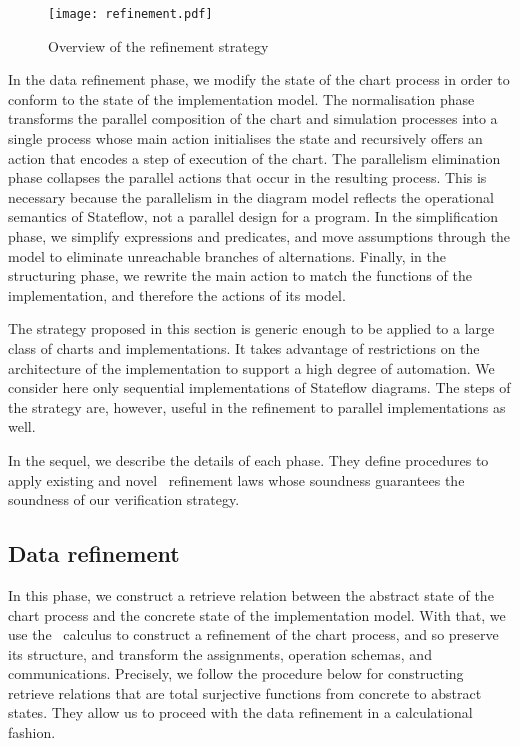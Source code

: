 \documentclass[submission]{eptcs}
\begin{document}
\begin{figure}
\centering
\texttt{[image: refinement.pdf]}
\caption{Overview of the refinement strategy}
\label{fig:strategy}
\end{figure}

In the data refinement phase, we modify the state of the chart process in order to conform to the state of the implementation model. The normalisation phase transforms the parallel composition of the chart and simulation processes into a single process whose main action initialises the state and recursively offers an action that encodes a step of execution of the chart. The parallelism elimination phase collapses the parallel actions that occur in the resulting process. This is necessary because the parallelism in the diagram model reflects the operational semantics of Stateflow, not a parallel design for a program. In the simplification phase, we simplify expressions and predicates, and move assumptions through the model to eliminate unreachable branches of alternations. Finally, in the structuring phase, we rewrite the main action to match the functions of the implementation, and therefore the actions of its model.

The strategy proposed in this section is generic enough to be applied to a large class of charts and implementations. It takes advantage of restrictions on the architecture of the implementation to support a high degree of automation. We consider here only sequential implementations of Stateflow diagrams. The steps of the strategy are, however, useful in the refinement to parallel implementations as well.

In the sequel, we describe the details of each phase. They define procedures to apply existing and novel \Circus\ refinement laws whose soundness guarantees the soundness of our verification strategy.

\subsection{Data refinement}
\label{subsec:data}

In this phase, we construct a retrieve relation between the abstract state of the chart process and the concrete state of the implementation model. With that, we use the \Circus~calculus to construct a refinement of the chart process, and so preserve its structure, and transform the assignments, operation schemas, and communications. Precisely, we follow the procedure below for constructing retrieve relations that are total surjective functions from concrete to abstract states. They allow us to proceed with the data refinement in a calculational fashion.
\end{document}
